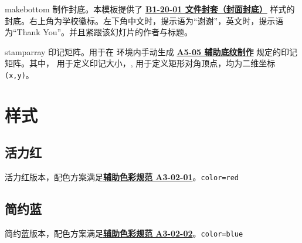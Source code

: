 \documentclass[a4paper,12pt]{article}
\begin{document}
\begin{docCommand*}[]{makebottom}{}
    制作封底。本模板提供了 \href{https://vi.sjtu.edu.cn/index.php/articles/app/7}{\textbf{B1-20-01 文件封套（封面封底）}} 样式的封底。右上角为学校徽标。左下角中文时，提示语为“谢谢”，英文时，提示语为``Thank You''。并且紧跟该幻灯片的作者与标题。
\end{docCommand*}

\begin{docCommand*}[]{stamparray}{}
    印记矩阵。用于在  环境内手动生成 \href{http://vi.sjtu.edu.cn/index.php/articles/base/5}{\textbf{A5-05 辅助底纹制作}} 规定的印记矩阵。其中， 用于定义印记大小，, 用于定义矩形对角顶点，均为二维坐标 \verb"(x,y)"。 
\end{docCommand*}

\newpage
\section{样式}

\subsection{活力红}

活力红版本，配色方案满足\href{http://vi.sjtu.edu.cn/index.php/articles/base/3}{\textbf{辅助色彩规范 A3-02-01}}。\hfill\texttt{color=red}

\begin{tcbraster}[raster columns=3,colframe=red,colback=white,
    colbacktitle=red!50!white,fonttitle=\small\bfseries\ttfamily,
    left=0pt,right=0pt,top=0pt,bottom=0pt,boxsep=0pt,boxrule=0.6pt,
    toptitle=1mm,bottomtitle=1mm,drop lifted shadow,center title,
    graphics pages={1,...,12}]
\end{tcbraster}

\clearpage
\subsection{简约蓝}

简约蓝版本，配色方案满足\href{http://vi.sjtu.edu.cn/index.php/articles/base/3}{\textbf{辅助色彩规范 A3-02-02}}。\hfill \texttt{color=blue}

\end{document}
